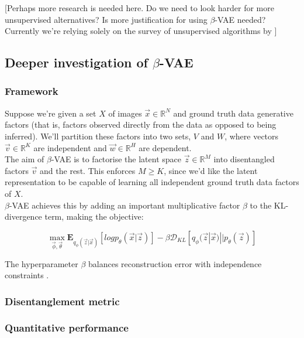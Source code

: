 \documentclass[12pt,twoside]{article}
\begin{document}
[Perhaps more research is needed here. Do we need to look harder for more unsupervised alternatives? Is more justification for using $\beta$-VAE needed? Currently we're relying solely on the survey of unsupervised algorithms by \cite{Higgins2016}]\\

\subsection{Deeper investigation of $\beta$-VAE}
\subsubsection{Framework}

Suppose we're given a set $X$ of images $\vec{x}\in\mathbb{R}^N$ and ground truth data generative factors (that is, factors observed directly from the data as opposed to being inferred). We'll partition these factors into two sets, $V$ and $W$, where vectors $\vec{v}\in\mathbb{R}^K$ are independent and $\vec{w}\in\mathbb{R}^H$ are dependent.\\

The aim of $\beta$-VAE is to factorise the latent space $\vec{z}\in\mathbb{R}^M$ into disentangled factors $\vec{v}$ and the rest. This enforces $M\geq K$, since we'd like the latent representation to be capable of learning all independent ground truth data factors of $X$.\\

$\beta$-VAE achieves this by adding an important multiplicative factor $\beta$ to the KL-divergence term, making the objective:

\begin{equation}
\label{beta_vae_objective}
\max_{\vec{\phi},\vec{\theta}}\mathbf{E}_{q_{\phi}(\vec{z}|\vec{x})}[log p_{\theta}(\vec{x}|\vec{z})] - \beta\mathcal{D}_{KL}[q_{\phi}(\vec{z}|\vec{x})||p_{\theta}(\vec{z})]
\end{equation}

The hyperparameter $\beta$ balances reconstruction error with independence constraints \cite{Higgins2016}.

\subsubsection{Disentanglement metric}
\subsubsection{Quantitative performance}
\end{document}
